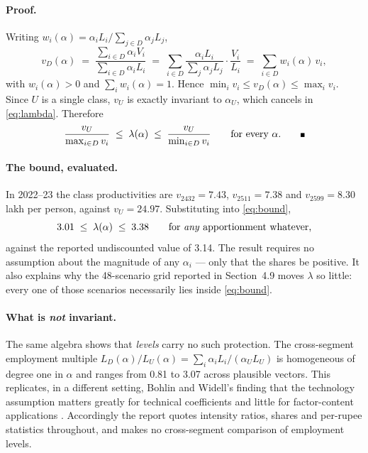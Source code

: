 \paragraph{Proof.} Writing $w_i(\alpha) = \alpha_i L_i \big/ \sum_{j \in D} \alpha_j L_j$,
\begin{equation}
    v_D(\alpha)
    \;=\; \frac{\sum_{i \in D} \alpha_i V_i}{\sum_{i \in D} \alpha_i L_i}
    \;=\; \sum_{i \in D} \frac{\alpha_i L_i}{\sum_{j} \alpha_j L_j} \cdot \frac{V_i}{L_i}
    \;=\; \sum_{i \in D} w_i(\alpha)\, v_i ,
    \label{eq:weighted}
\end{equation}
with $w_i(\alpha) > 0$ and $\sum_i w_i(\alpha) = 1$. Hence
$\min_i v_i \le v_D(\alpha) \le \max_i v_i$. Since $U$ is a single class,
$v_U$ is exactly invariant to $\alpha_U$, which cancels in \eqref{eq:lambda}.
Therefore
\begin{equation}
    \frac{v_U}{\max_{i \in D} v_i} \;\le\; \lambda(\alpha) \;\le\; \frac{v_U}{\min_{i \in D} v_i}
    \qquad \text{for every } \alpha . \qquad \rule{0.9ex}{0.9ex}
    \label{eq:bound}
\end{equation}

\paragraph{The bound, evaluated.} In 2022--23 the class productivities are
$v_{2432} = 7.43$, $v_{2511} = 7.38$ and $v_{2599} = 8.30$ lakh per person, against
$v_U = 24.97$. Substituting into \eqref{eq:bound},
\[
    3.01 \;\le\; \lambda(\alpha) \;\le\; 3.38
    \qquad \text{for \emph{any} apportionment whatever,}
\]
against the reported undiscounted value of 3.14. The result requires no assumption
about the magnitude of any $\alpha_i$ --- only that the shares be positive. It also
explains why the 48-scenario grid reported in Section~4.9 moves $\lambda$ so little:
every one of those scenarios necessarily lies inside \eqref{eq:bound}.

\paragraph{What is \emph{not} invariant.} The same algebra shows that
\emph{levels} carry no such protection. The cross-segment employment multiple
$L_D(\alpha)/L_U(\alpha) = \sum_i \alpha_i L_i / (\alpha_U L_U)$ is homogeneous of
degree one in $\alpha$ and ranges from 0.81 to 3.07 across plausible vectors.
This replicates, in a different setting, Bohlin and Widell's finding that the
technology assumption matters greatly for technical coefficients and little for
factor-content applications \cite{bohlin2006}. Accordingly the report quotes
intensity ratios, shares and per-rupee statistics throughout, and makes no
cross-segment comparison of employment levels.

